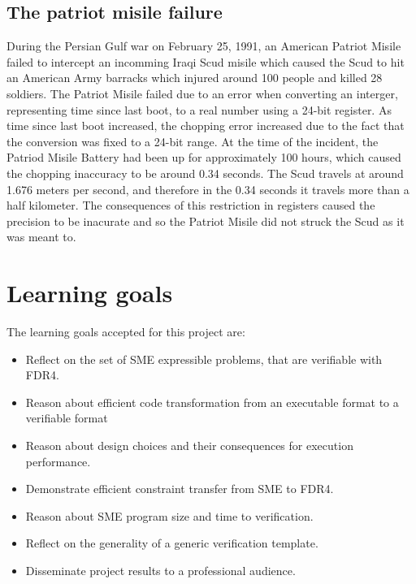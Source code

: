 \subsection{The patriot misile failure}
During the Persian Gulf war on February 25, 1991, an American Patriot Misile failed to intercept an incomming Iraqi Scud misile which caused the Scud to hit an American Army barracks which injured around 100 people and killed 28 soldiers. The Patriot Misile failed due to an error when converting an interger, representing time since last boot, to a real number using a 24-bit register. As time since last boot increased, the chopping error increased due to the fact that the conversion was fixed to a 24-bit range. At the time of the incident, the Patriod Misile Battery had been up for approximately 100 hours, which caused the chopping inaccuracy to be around 0.34 seconds. The Scud travels at around 1.676 meters per second, and therefore in the 0.34 seconds it travels more than a half kilometer. The consequences of this restriction in  registers caused the precision to be inacurate and so the Patriot Misile did not struck the Scud as it was meant to.

\section{Learning goals}
The learning goals accepted for this project are:
\begin{itemize}
\item Reflect on the set of SME expressible problems, that are verifiable with FDR4.
\item Reason about efficient code transformation from an executable format to a verifiable format
\item Reason about design choices and their consequences for execution performance.
\item Demonstrate efficient constraint transfer from SME to FDR4.
\item Reason about SME program size and time to verification.
\item Reflect on the generality of a generic verification template.
\item Disseminate project results to a professional audience.
\end{itemize}

